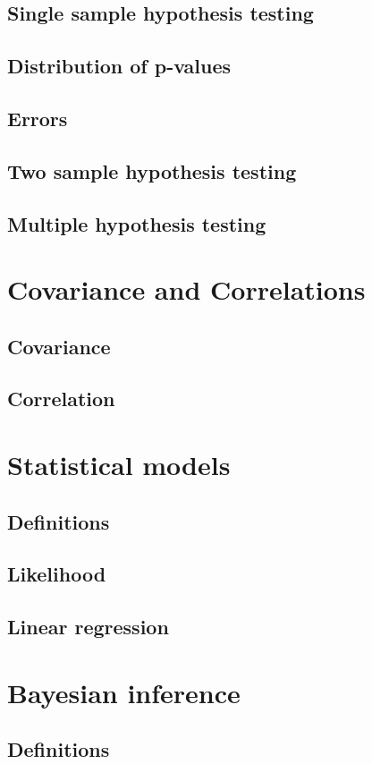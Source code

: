 \documentclass[../Year1.tex]{subfiles}
\begin{document}
\subsection{Single sample hypothesis testing}
\subsection{Distribution of p-values}
\subsection{Errors}
\subsection{Two sample hypothesis testing}
\subsection{Multiple hypothesis testing}
\section{Covariance and Correlations}
\subsection{Covariance}
\subsection{Correlation}
\section{Statistical models}
\subsection{Definitions}
\subsection{Likelihood}
\subsection{Linear regression}
\section{Bayesian inference}
\subsection{Definitions}
\end{document}
